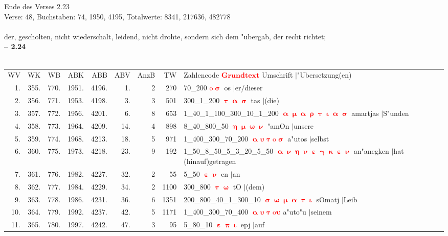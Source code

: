 \documentclass[a4paper,10pt,landscape]{article}
\begin{document}
Ende des Verses 2.23\\
Verse: 48, Buchstaben: 74, 1950, 4195, Totalwerte: 8341, 217636, 482778\\
\\
der, gescholten, nicht wiederschalt, leidend, nicht drohte, sondern sich dem "ubergab, der recht richtet;\\
\newpage 
{\bf -- 2.24}\\
\medskip \\
\begin{tabular}{rrrrrrrrp{120mm}}
WV&WK&WB&ABK&ABB&ABV&AnzB&TW&Zahlencode \textcolor{red}{$\boldsymbol{Grundtext}$} Umschrift $|$"Ubersetzung(en)\\
1.&355.&770.&1951.&4196.&1.&2&270&70\_200 \textcolor{red}{$\boldsymbol{\mathrm{o}\upsigma}$} os $|$er/dieser\\
2.&356.&771.&1953.&4198.&3.&3&501&300\_1\_200 \textcolor{red}{$\boldsymbol{\uptau\upalpha\upsigma}$} tas $|$(die)\\
3.&357.&772.&1956.&4201.&6.&8&653&1\_40\_1\_100\_300\_10\_1\_200 \textcolor{red}{$\boldsymbol{\upalpha\upmu\upalpha\uprho\uptau\upiota\upalpha\upsigma}$} amartjas $|$S"unden\\
4.&358.&773.&1964.&4209.&14.&4&898&8\_40\_800\_50 \textcolor{red}{$\boldsymbol{\upeta\upmu\upomega\upnu}$} "amOn $|$unsere\\
5.&359.&774.&1968.&4213.&18.&5&971&1\_400\_300\_70\_200 \textcolor{red}{$\boldsymbol{\upalpha\upsilon\uptau\mathrm{o}\upsigma}$} a"utos $|$selbst\\
6.&360.&775.&1973.&4218.&23.&9&192&1\_50\_8\_50\_5\_3\_20\_5\_50 \textcolor{red}{$\boldsymbol{\upalpha\upnu\upeta\upnu\upepsilon\upgamma\upkappa\upepsilon\upnu}$} an"anegken $|$hat (hinauf)getragen\\
7.&361.&776.&1982.&4227.&32.&2&55&5\_50 \textcolor{red}{$\boldsymbol{\upepsilon\upnu}$} en $|$an\\
8.&362.&777.&1984.&4229.&34.&2&1100&300\_800 \textcolor{red}{$\boldsymbol{\uptau\upomega}$} tO $|$(dem)\\
9.&363.&778.&1986.&4231.&36.&6&1351&200\_800\_40\_1\_300\_10 \textcolor{red}{$\boldsymbol{\upsigma\upomega\upmu\upalpha\uptau\upiota}$} sOmatj $|$Leib\\
10.&364.&779.&1992.&4237.&42.&5&1171&1\_400\_300\_70\_400 \textcolor{red}{$\boldsymbol{\upalpha\upsilon\uptau\mathrm{o}\upsilon}$} a"uto"u $|$seinem\\
11.&365.&780.&1997.&4242.&47.&3&95&5\_80\_10 \textcolor{red}{$\boldsymbol{\upepsilon\uppi\upiota}$} epj $|$auf\\

\end{tabular}
\end{document}

